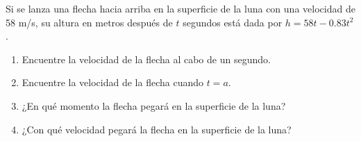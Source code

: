 \item Si se lanza una flecha hacia arriba en la superficie de la luna con una velocidad de 58 m/s, su altura en metros después de $t$ segundos está dada por $h = 58t - 0.83t^2$.
    \begin{enumerate}
        \item Encuentre la velocidad de la flecha al cabo de un segundo.
        \item Encuentre la velocidad de la flecha cuando $t = a$.
        \item ¿En qué momento la flecha pegará en la superficie de la luna?
        \item ¿Con qué velocidad pegará la flecha en la superficie de la luna?
    \end{enumerate}

